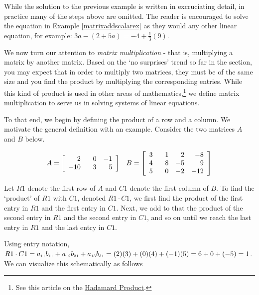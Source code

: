 \documentclass{ximera}
\begin{document}
While the solution to the previous example is written in excruciating detail, in practice many of the steps above are omitted.  The reader is encouraged to solve the equation in Example \ref{matrixaddscalarex} as they would any other linear equation, for example: $3a-(2+5a)=-4+\frac{1}{3}(9)$.

\smallskip

We now turn our attention to \textit{matrix multiplication} - that is, multiplying a matrix by another matrix.  Based on the `no surprises' trend so far in the section, you may expect that in order to multiply two matrices, they must be of the same size and you find the product by multiplying the corresponding entries.  While this kind of product is used in other areas of mathematics,\footnote{See this article on the \href{http://en.wikipedia.org/wiki/Matrix_multiplication}{\underline{Hadamard Product}}.} we define matrix multiplication to serve us in solving systems of linear equations.  

To that end, we begin by defining the product of a row and a column.  We motivate the general definition with an example.  Consider the two matrices $A$ and $B$ below.

\[ \begin{array}{cc}

A = \left[\begin{array}{rrr} 2 & \hphantom{-}0 & -1 \\ -10 & 3 & 5 \\ \end{array} \right]

&

B = \left[\begin{array}{rrrr} 3 & \hphantom{-}1 & 2 & -8 \\ 4 & 8 & -5 & 9  \\ 5 & 0 & -2 & -12 \\  \end{array} \right]

\end{array}\]

Let $R1$ denote the first row of $A$ and $C1$ denote the first column of $B$.  To find the `product' of $R1$ with $C1$, denoted $R1 \cdot C1$, we first find the product of the first entry in $R1$ and the first entry in $C1$.  Next, we add to that the product of the second entry in $R1$ and the second entry in $C1$, and so on until we reach the last entry in $R1$ and the last entry in $C1$.  

Using entry notation, $R1 \cdot C1 = a_{\mbox{\tiny$11$}}b_{\mbox{\tiny$11$}} + a_{\mbox{\tiny$12$}}b_{\mbox{\tiny$21$}}+a_{\mbox{\tiny$13$}}b_{\mbox{\tiny$31$}} = (2)(3) + (0)(4) + (-1)(5) = 6 + 0 + (-5) = 1$.  We can visualize this schematically as follows
\end{document}
